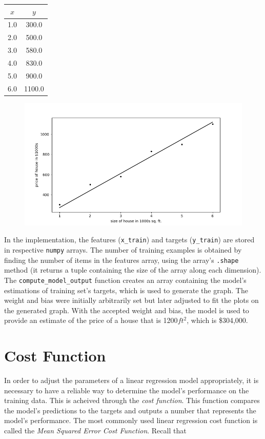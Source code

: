 \documentclass{article}
\begin{document}
\begin{center}
\centering
\begin{tabular}{|c|c|} 
\hline
\textbf{$x$} & \textbf{$y$} \\ 
\hline
1.0 & 300.0 \\ 
\hline
2.0 & 500.0 \\ 
\hline
3.0 & 580.0 \\ 
\hline
4.0 & 830.0 \\ 
\hline
5.0 & 900.0 \\ 
\hline
6.0 & 1100.0 \\ 
\hline
\end{tabular}
\end{center}

\begin{figure}
\centering
\includegraphics[width=1\textwidth]{images/linear_regression.png}
\end{figure}

\noindent In the implementation, the features (\texttt{x\_train}) and targets (\texttt{y\_train}) are stored in respective \texttt{numpy} arrays. The number of training examples is obtained by finding the number of items in the features array, using the array's \texttt{.shape} method (it returns a tuple containing the size of the array along each dimension). The \texttt{compute\_model\_output} function creates an array containing the model's estimations of training set's targets, which is used to generate the graph. The weight and bias were initially arbitrarily set but later adjusted to fit the plots on the generated graph. With the accepted weight and bias, the model is used to provide an estimate of the price of a house that is 1200$ft^2$, which is \$304,000.

\section{Cost Function}
In order to adjust the parameters of a linear regression model appropriately, it is necessary to have a reliable way to determine the model's performance on the training data. This is acheived through the \textit{cost function}. This function compares the model's predictions to the targets and outputs a number that represents the model's performance. The most commonly used linear regression cost function is called the \textit{Mean Squared Error Cost Function}. Recall that
\end{document}
